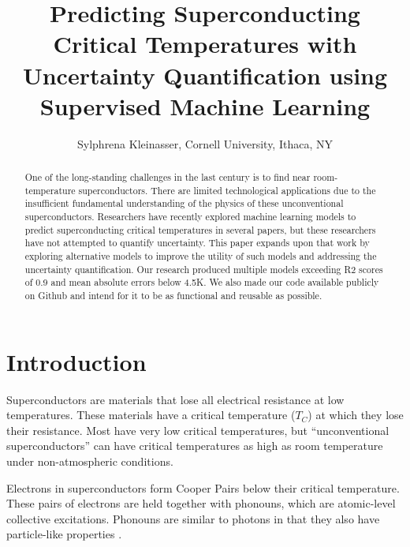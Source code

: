 \documentclass[twocolumn, nofootinbib, secnumarabic, amssymb, nobibnotes, aps, prd]{revtex4-2}
\begin{document}
\begin{abstract}
One of the long-standing challenges in the last century is to find near room-temperature superconductors. There are limited technological applications due to the insufficient fundamental understanding of the physics of these unconventional superconductors. Researchers have recently explored machine learning models to predict superconducting critical temperatures in several papers, but these researchers have not attempted to quantify uncertainty. This paper expands upon that work by exploring alternative models to improve the utility of such models and addressing the  uncertainty quantification. Our research produced multiple models exceeding R2 scores of 0.9 and mean absolute errors below 4.5K. We also made our code available publicly on Github and intend for it to be as functional and reusable as possible. 
\end{abstract}


\title{Predicting Superconducting Critical Temperatures with Uncertainty Quantification using Supervised Machine Learning}

\author{Sylphrena Kleinasser, Cornell University, Ithaca, NY}

\maketitle

\section{Introduction}
Superconductors are materials that lose all electrical resistance at low temperatures. These materials have a critical temperature ($T_C$) at which they lose their resistance. Most have very low critical temperatures, but “unconventional superconductors” can have critical temperatures as high as room temperature under non-atmospheric conditions. 

Electrons in superconductors form Cooper Pairs below their critical temperature. These pairs of electrons are held together with phonouns, which are atomic-level collective excitations. Phonouns are similar to photons in that they also have particle-like properties \cite{rohlf_1994, BussmannHolderKeller2020}.
\end{document}
